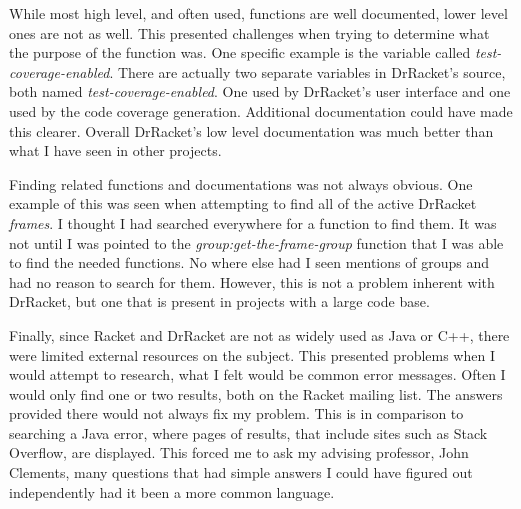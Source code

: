While most high level, and often used, functions are well documented, lower level ones are not as well. This presented challenges when trying to determine what the purpose of the function was. One specific example is the variable called \emph{test-coverage-enabled}. There are actually two separate variables in DrRacket's source, both named \emph{test-coverage-enabled}. One used by DrRacket's user interface and one used by the code coverage generation. Additional documentation could have made this clearer. Overall DrRacket's low level documentation was much better than what I have seen in other projects.

Finding related functions and documentations was not always obvious. One example of this was seen when attempting to find all of the active DrRacket \emph{frames}. I thought I had searched everywhere for a function to find them. It was not until I was pointed to the \emph{group:get-the-frame-group} function that I was able to find the needed functions. No where else had I seen mentions of groups and had no reason to search for them. However, this is not a problem inherent with DrRacket, but one that is present in projects with a large code base.

Finally, since Racket and DrRacket are not as widely used as Java or C++, there were limited external resources on the subject. This presented problems when I would attempt to research, what I felt would be common error messages. Often I would only find one or two results, both on the Racket mailing list. The answers provided there would not always fix my problem. This is in comparison to searching a Java error, where pages of results, that include sites such as Stack Overflow, are displayed. This forced me to ask my advising professor, John Clements, many questions that had simple answers I could have figured out independently had it been a more common language. 